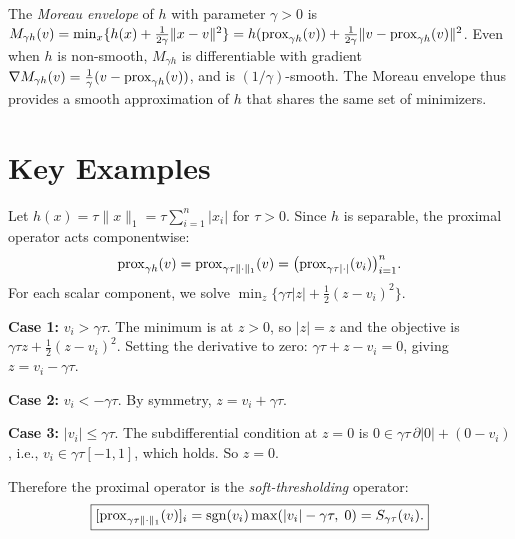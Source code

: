 \documentclass[11pt,a4paper]{article}
\begin{document}
\begin{remark}\label{rem:moreau}
The \emph{Moreau envelope} of $h$ with parameter $\gamma > 0$ is
$M_{\gamma h}(v) = \min_x \{h(x) + \frac{1}{2\gamma}\|x - v\|^2\}
= h(\operatorname{prox}_{\gamma h}(v)) + \frac{1}{2\gamma}\|v - \operatorname{prox}_{\gamma h}(v)\|^2$.
Even when $h$ is non-smooth, $M_{\gamma h}$ is differentiable with
gradient $\nabla M_{\gamma h}(v) = \frac{1}{\gamma}(v - \operatorname{prox}_{\gamma h}(v))$,
and is $(1/\gamma)$-smooth. The Moreau envelope thus provides a smooth
approximation of $h$ that shares the same set of minimizers.
\end{remark}


\section{Key Examples}\label{sec:examples}

\begin{example}%
\label{ex:soft-thresh}
Let $h(x) = \tau\|x\|_1 = \tau \sum_{i=1}^n |x_i|$ for $\tau > 0$.
Since $h$ is separable, the proximal operator acts componentwise:
\[
  \operatorname{prox}_{\gamma h}(v) = \operatorname{prox}_{\gamma\tau\|\cdot\|_1}(v)
  = \bigl(\operatorname{prox}_{\gamma\tau|\cdot|}(v_i)\bigr)_{i=1}^n.
\]
For each scalar component, we solve
$\min_z \{\gamma\tau|z| + \frac{1}{2}(z - v_i)^2\}$.

\textbf{Case 1:} $v_i > \gamma\tau$. The minimum is at $z > 0$, so
$|z| = z$ and the objective is $\gamma\tau z + \frac{1}{2}(z - v_i)^2$.
Setting the derivative to zero: $\gamma\tau + z - v_i = 0$, giving
$z = v_i - \gamma\tau$.

\textbf{Case 2:} $v_i < -\gamma\tau$. By symmetry, $z = v_i + \gamma\tau$.

\textbf{Case 3:} $|v_i| \le \gamma\tau$. The subdifferential condition
at $z = 0$ is $0 \in \gamma\tau\, \partial|0| + (0 - v_i)$, i.e.,
$v_i \in \gamma\tau[-1, 1]$, which holds. So $z = 0$.

Therefore the proximal operator is the \emph{soft-thresholding} operator:
\begin{equation}\label{eq:soft-thresh}
  \boxed{
  [\operatorname{prox}_{\gamma\tau\|\cdot\|_1}(v)]_i
  = \operatorname{sgn}(v_i)\max(|v_i| - \gamma\tau,\; 0)
  = S_{\gamma\tau}(v_i).
  }
\end{equation}
\end{example}
\end{document}
